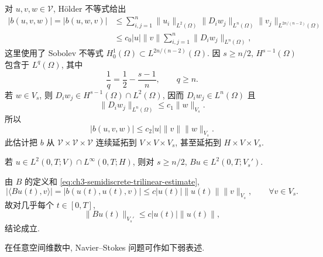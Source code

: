 \begin{Proof}
对 $u,v,w\in\mathcal V$, Hölder 不等式给出
\[
\begin{aligned}
|b(u,v,w)|=|b(u,w,v)|
&\leq\sum_{i,j=1}^n\lVert u_i\rVert_{L^2(\Omega)}
\lVert D_iw_j\rVert_{L^n(\Omega)}
\lVert v_j\rVert_{L^{2n/(n-2)}(\Omega)}\\
&\leq c_0|u|\lVert v\rVert\sum_{i,j=1}^n
\lVert D_iw_j\rVert_{L^n(\Omega)},
\end{aligned}
\]
这里使用了 Sobolev 不等式 $H_0^1(\Omega)\subset L^{2n/(n-2)}(\Omega)$. 因 $s\geq n/2$, $H^{s-1}(\Omega)$ 包含于 $L^q(\Omega)$, 其中
\begin{equation}
\frac1q=\frac12-\frac{s-1}{n},
\qquad q\geq n.
\label{eq:ch3-semidiscrete-sobolev-exponent}
\end{equation}
若 $w\in V_s$, 则 $D_iw_j\in H^{s-1}(\Omega)\cap L^2(\Omega)$, 因而 $D_iw_j\in L^n(\Omega)$ 且
\[
\lVert D_iw_j\rVert_{L^n(\Omega)}\leq c_1\lVert w\rVert_{V_s}.
\]
所以
\begin{equation}
|b(u,v,w)|\leq c_2|u|\lVert v\rVert\lVert w\rVert_{V_s}.
\label{eq:ch3-semidiscrete-trilinear-estimate-dense}
\end{equation}
此估计把 $b$ 从 $\mathcal V\times\mathcal V\times\mathcal V$ 连续延拓到 $V\times V\times V_s$, 甚至延拓到 $H\times V\times V_s$.
\end{Proof}

\begin{Lemma}
\label{lem:ch3-semidiscrete-bu-vs-dual}
若 $u\in L^2(0,T;V)\cap L^\infty(0,T;H)$, 则对 $s\geq n/2$, $Bu\in L^2(0,T;V_s')$.
\end{Lemma}

\begin{Proof}
由 $B$ 的定义和 \eqref{eq:ch3-semidiscrete-trilinear-estimate},
\[
|\langle Bu(t),v\rangle|=|b(u(t),u(t),v)|
\leq c|u(t)|\lVert u(t)\rVert\lVert v\rVert_{V_s},
\qquad\forall v\in V_s.
\]
故对几乎每个 $t\in[0,T]$,
\[
\lVert Bu(t)\rVert_{V_s'}\leq c|u(t)|\lVert u(t)\rVert,
\]
结论成立.
\end{Proof}

\hypertarget{chapter-03-page-233}{}
在任意空间维数中, Navier--Stokes 问题可作如下弱表述.


